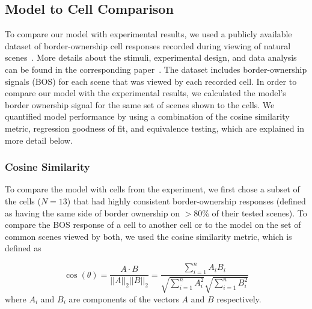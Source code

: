 \subsection{Model to Cell Comparison}
\label{sec:cell_model}
To compare our model with experimental results, we used a publicly available dataset of border-ownership cell responses recorded during viewing of natural scenes~\citep{Jonathan_data}. More details about the stimuli, experimental design, and data analysis can be found in the corresponding paper~\citep{Williford_vonderHeydt16}.
The dataset includes border-ownership signals (BOS) for each scene that was viewed by each recorded cell. In order to compare our model with the experimental results, we calculated the model's border ownership signal for the same set of scenes shown to the cells. We quantified model performance by using a combination of the cosine similarity metric, regression goodness of fit, and equivalence testing, which are explained in more detail below.
%

\subsubsection{Cosine Similarity}
To compare the model with cells from the experiment, we first chose a subset of the cells ($N=13$) that had highly consistent border-ownership responses (defined as having the same side of border ownership on $>$80\% of their tested scenes). To compare the BOS response of a cell to another cell or to the model on the set of common scenes viewed by both, we used the cosine similarity metric, which is defined as

\begin{equation}
\cos(\theta) = \frac{A \cdot B}{||A||_{2}||B||_{2}} = \frac{\sum\limits_{i=1}^{n}A_{i}B_{i}}{\sqrt{\sum\limits_{i=1}^{n}A_{i}^2}\sqrt{\sum\limits_{i=1}^{n}B_{i}^2}}
\label{eq:cos_sim}
\end{equation}
where $A_i$ and $B_i$ are components of the vectors $A$ and $B$ respectively.

